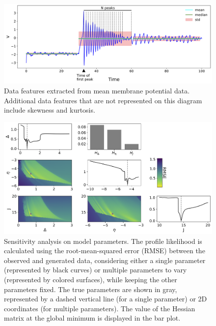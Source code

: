 \documentclass[preprint,11pt,authoryear]{elsarticle}
\begin{document}
\begin{figure}[ht]
    \centering
    \includegraphics[width=\linewidth]{Figs/FigS2.png}
    \renewcommand{\thefigure}{S\arabic{figure}}
    \caption{Data features extracted from mean membrane potential data. Additional data features that are not represented on this diagram include skewness and kurtosis.}
    \label{fig:DataFeatures}
\end{figure}






\begin{figure}[ht]
    \centering
    \includegraphics[width=\linewidth]{Figs/FigS3.png}
    \renewcommand{\thefigure}{S\arabic{figure}}
    \caption{Sensitivity analysis on model parameters.  The profile likelihood is calculated using the root-mean-squared error (RMSE) between the observed and generated data, considering either a single parameter (represented by black curves) or multiple parameters to vary (represented by colored surfaces), while keeping the other parameters fixed. The true parameters are shown in gray, represented by a dashed vertical line (for a single parameter) or 2D coordinates (for multiple parameters).  The value of the Hessian matrix at the global minimum is displayed in the bar plot.}
    \label{fig:SensitivityAnalysis}
\end{figure}
\end{document}
